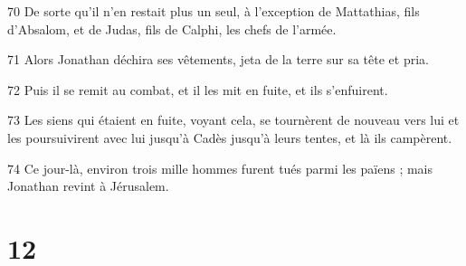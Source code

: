 \par 70 De sorte qu'il n'en restait plus un seul, à l'exception de Mattathias, fils d'Absalom, et de Judas, fils de Calphi, les chefs de l'armée.
\par 71 Alors Jonathan déchira ses vêtements, jeta de la terre sur sa tête et pria.
\par 72 Puis il se remit au combat, et il les mit en fuite, et ils s'enfuirent.
\par 73 Les siens qui étaient en fuite, voyant cela, se tournèrent de nouveau vers lui et les poursuivirent avec lui jusqu'à Cadès jusqu'à leurs tentes, et là ils campèrent.
\par 74 Ce jour-là, environ trois mille hommes furent tués parmi les païens ; mais Jonathan revint à Jérusalem.

\chapter{12}

